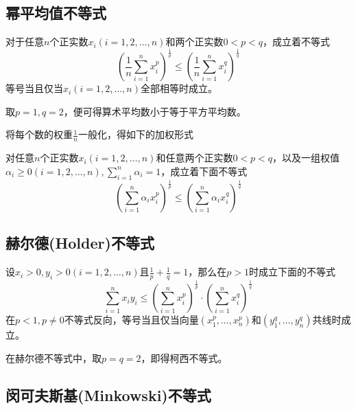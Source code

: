\subsection{幂平均值不等式}

\begin{theorem}[幂平均值不等式]
  对于任意$n$个正实数$x_i(i=1,2,\ldots,n)$和两个正实数$0<p<q$，成立着不等式
  \begin{equation}
    \label{eq:pow-mean-inequation}
    \left( \frac{1}{n}\sum_{i=1}^nx_i^{p} \right)^{\frac{1}{p}}
    \leqslant \left( \frac{1}{n}\sum_{i=1}^nx_i^{q} \right)^{\frac{1}{q}}
  \end{equation}
  等号当且仅当$x_i(i=1,2,\ldots,n)$全部相等时成立。
\end{theorem}
取$p=1,q=2$，便可得算术平均数小于等于平方平均数。

将每个数的权重$\frac{1}{n}$一般化，得如下的加权形式
\begin{theorem}[加权幂平均值不等式]
  对任意$n$个正实数$x_i(i=1,2,\ldots,n)$和任意两个正实数$0<p<q$，以及一组权值$\alpha_i \geqslant 0(i=1,2,\ldots,n), \sum_{i=1}^n\alpha_i=1$，成立着下面不等式
  \begin{equation}
    \label{eq:pow-mean-inequation-with-weight}
    \left( \sum_{i=1}^n\alpha_ix_i^p \right)^{\frac{1}{p}}
    \leqslant \left( \sum_{i=1}^n\alpha_ix_i^q \right)^{\frac{1}{q}}
  \end{equation}
\end{theorem}

\subsection{赫尔德(Holder)不等式}

\begin{theorem}[赫尔德不等式]
  设$x_i> 0, y_i> 0 (i=1,2,\ldots,n)$且$\frac{1}{p}+\frac{1}{q}=1$，那么在$p>1$时成立下面的不等式
  \begin{equation}
    \label{eq:holder-inequation}
    \sum_{i=1}^nx_iy_i \leqslant \left( \sum_{i=1}^nx_i^p \right)^{\frac{1}{p}} \cdot \left( \sum_{i=1}^nx_i^q \right)^{\frac{1}{q}}
  \end{equation}
  在$p<1,p\neq 0$不等式反向，等号当且仅当向量$(x_1^p,\ldots,x_n^p)$和$(y_1^q,\ldots,y_n^q)$共线时成立。
\end{theorem}
在赫尔德不等式中，取$p=q=2$，即得柯西不等式。

\subsection{闵可夫斯基(Minkowski)不等式}


